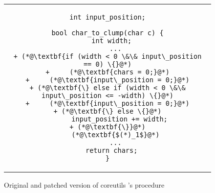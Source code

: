 \begin{figure}
\begin{tabular}{c}
\begin{lstlisting}
int input_position;

bool char_to_clump(char c) {
  int width;
    ...
+ (*@\textbf{if (width < 0 \&\& input\_position == 0) \{}@*)
+     (*@\textbf{chars = 0;}@*)
+     (*@\textbf{input\_position = 0;}@*)
+ (*@\textbf{\} else if (width < 0 \&\& input\_position <= -width) \{}@*)
+     (*@\textbf{input\_position = 0;}@*)
+ (*@\textbf{\} else \{}@*)
      input_position += width;
+ (*@\textbf{\}}@*)
    (*@\textbf{$(*)_1$}@*)
    ...
  return chars;
}
\end{lstlisting}
\end{tabular}
\caption{Original and patched version of coreutils 's  procedure}
\end{figure} 